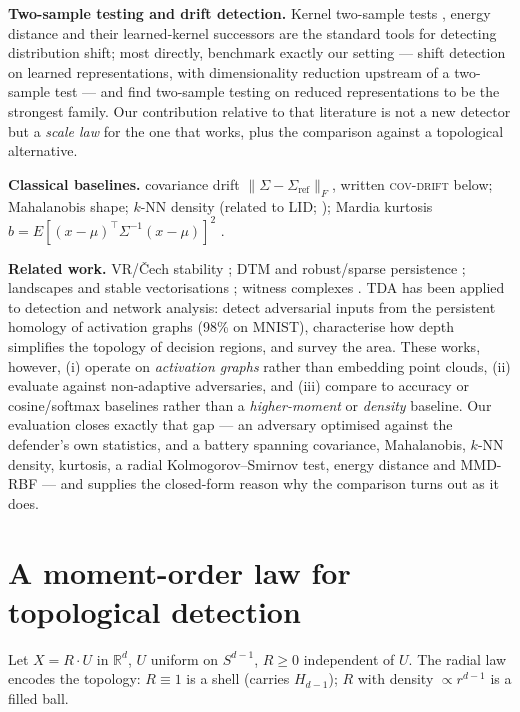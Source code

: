\documentclass[11pt]{article}
\theoremstyle{remark}
\begin{document}
\textbf{Two-sample testing and drift detection.} Kernel two-sample tests \citep{gretton2012kernel},
energy distance \citep{szekely2013energy} and their learned-kernel successors
\citep{liu2020deepkernel} are the standard tools for detecting distribution shift; most directly,
\citet{rabanser2019failing} benchmark exactly our setting --- shift detection on learned
representations, with dimensionality reduction upstream of a two-sample test --- and find
two-sample testing on reduced representations to be the strongest family. Our contribution
relative to that literature is not a new detector but a \emph{scale law} for the one that works,
plus the comparison against a topological alternative.

\textbf{Classical baselines.} covariance drift $\lVert\Sigma-\Sigma_{\mathrm{ref}}\rVert_F$, written \textsc{cov-drift} below;
Mahalanobis shape; $k$-NN density (related to LID; \citep{ma2018lid}); Mardia kurtosis
$b=E[(x-\mu)^\top\Sigma^{-1}(x-\mu)]^2$ \citep{mardia1970kurtosis}.

\textbf{Related work.} VR/\v{C}ech stability \citep{cohensteiner2007stability,chazal2009gromov};
DTM and robust/sparse persistence
\citep{chazal2011geometric,anai2020dtm,buchet2016efficient,sheehy2013linear}; landscapes and
stable vectorisations \citep{bubenik2015landscapes,adams2017images}; witness complexes
\citep{desilva2004witness}. TDA has been applied to detection and network analysis:
\citet{gebhart2017adversary} detect adversarial inputs from the persistent homology of activation
graphs (98\% on MNIST), \citet{naitzat2020topology} characterise how depth simplifies the topology
of decision regions, and \citet{ballester2023survey} survey the area. These works, however,
(i) operate on \emph{activation graphs} rather than embedding point clouds, (ii) evaluate against
non-adaptive adversaries, and (iii) compare to accuracy or cosine/softmax baselines rather than a
\emph{higher-moment} or \emph{density} baseline. Our evaluation closes exactly that gap --- an adversary optimised against the defender's own
statistics, and a battery spanning covariance, Mahalanobis, $k$-NN density, kurtosis, a radial
Kolmogorov--Smirnov test, energy distance and MMD-RBF --- and supplies the
closed-form reason why the comparison turns out as it does.

\section{A moment-order law for topological detection}\label{sec:theory}
Let $X=R\cdot U$ in $\mathbb{R}^d$, $U$ uniform on $S^{d-1}$, $R\ge 0$ independent of $U$. The
radial law encodes the topology: $R\equiv 1$ is a shell (carries $H_{d-1}$); $R$ with density
$\propto r^{d-1}$ is a filled ball.
\end{document}
